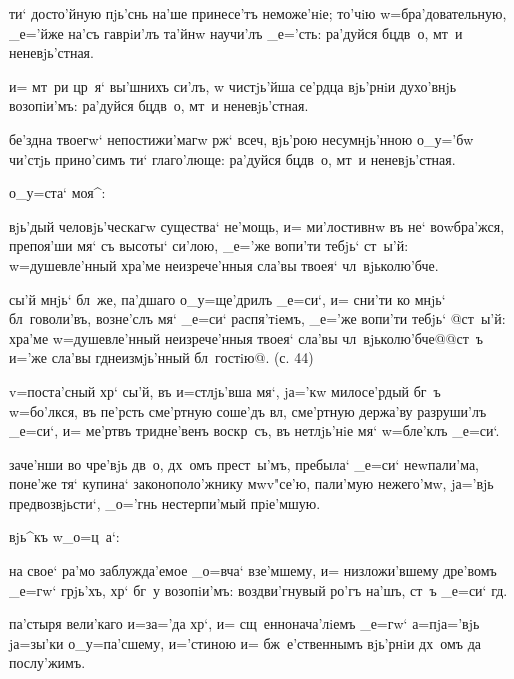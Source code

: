  ти` досто'йную пjь'снь на'ше принесе'тъ 
неможе'нiе; то'чiю w=бра'довательную, _е='йже на'съ 
гаврiи'лъ та'йнw научи'лъ _е='сть: ра'дуйся бц дв~о, 
мт~и неневjь'стная.

 и= мт~ри цр~я` вы'шнихъ си'лъ, w\т 
чистjь'йша се'рдца вjь'рнiи духо'внjь возопiи'мъ: 
ра'дуйся бц дв~о, мт~и неневjь'стная.

 бе'здна твоегw` непостижи'магw рж` 
всеч, вjь'рою несумнjь'нною о_у='бw чи'стjь 
прино'симъ ти` глаго'люще: ра'дуйся бц дв~о, мт~и 
неневjь'стная.

    о_у=ста` моя^:


  вjь'дый человjь'ческагw существа` 
не'мощь, и= ми'лостивнw въ не` воwбра'жся, препоя'ши мя` 
съ высоты` си'лою, _е='же вопи'ти тебjь` ст~ы'й: 
w=душевле'нный хра'ме неизрече'нныя сла'вы твоея` 
чл~вjьколю'бче.

 сы'й мнjь` бл~же, па'дшаго о_у=ще'дрилъ _е=си`, 
и= сни'ти ко мнjь` бл~говоли'въ, возне'слъ мя` _е=си` 
распя'тiемъ, _е='же вопи'ти тебjь` @ст~ы'й: хра'ме 
w=душевле'нный неизрече'нныя твоея` сла'вы 
чл~вjьколю'бче@{@ст~ъ и='же сла'вы гд неизмjь'нный 
бл~гостiю@}. (с. 44)

 v=поста'сный хр` сы'й, въ и=стлjь'вша 
мя`, jа='кw милосе'рдый бг~ъ w=бо'лкся, въ пе'рсть 
сме'ртную соше'дъ вл, сме'ртную держа'ву разруши'лъ 
_е=си`, и= ме'ртвъ тридне'венъ воскр~съ, въ нетлjь'нiе 
мя` w=бле'клъ _е=си`.

  заче'нши во чре'вjь дв~о, дх~омъ 
прест~ы'мъ, пребыла` _е=си` неwпали'ма, поне'же тя` 
купина` законополо'жнику мwv"се'ю, пали'мую нежего'мw, 
jа='вjь предвозвjьсти`, _о='гнь нестерпи'мый прiе'мшую.

   вjь^къ w\т _о=ц~а`:

 на свое` ра'мо заблужда'емое _о=вча` взе'мшему, 
и= низложи'вшему дре'вомъ _е=гw` грjь'хъ, хр` бг~у 
возопiи'мъ: воздви'гнувый ро'гъ на'шъ, ст~ъ _е=си` гд.

 па'стыря вели'каго и=з\ъ а='да хр`, 
и= сщ~еннонача'лiемъ _е=гw` а=п jа='вjь jа=зы'ки 
о_у=па'сшему, и='стиною и= бж~е'ственнымъ вjь'рнiи дх~омъ 
да послу'жимъ.

